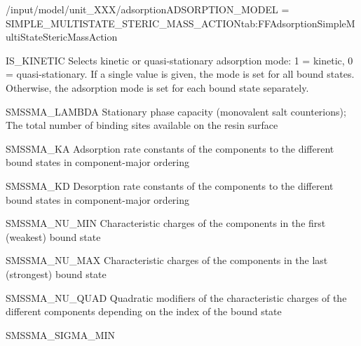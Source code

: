 \begin{condsubgroup}{/input/model/unit\_XXX/adsorption}{ADSORPTION\_MODEL = SIMPLE\_MULTISTATE\_STERIC\_MASS\_ACTION}{tab:FFAdsorptionSimpleMultiStateStericMassAction}
\begin{dataset}[type=int,range={$\{ 0,1 \}$},length={1 / \texttt{NTOTALBND}}]{IS\_KINETIC}
    Selects kinetic or quasi-stationary adsorption mode: 1 = kinetic, 0 = quasi-stationary.
    If a single value is given, the mode is set for all bound states.
    Otherwise, the adsorption mode is set for each bound state separately.
  \end{dataset}
  \begin{dataset}[unit=\si{\mol\per\cubic\metre\of{SP}}, type = double, range={$\geq 0$}, length={1}]{SMSSMA\_LAMBDA} 
    Stationary phase capacity (monovalent salt counterions); The total number of binding sites available on the resin surface
  \end{dataset}
  \begin{dataset}[unit=\si{\raiseto{3}\metre\of{MP}\per\raiseto{3}\metre\of{SP}\per\second} , type = double, range={$\geq 0$}, length={\texttt{NTOTALBND}}]{SMSSMA\_KA} 
    Adsorption rate constants of the components to the different bound states in component-major ordering
  \end{dataset} 
  \begin{dataset}[unit=\si{\per\second}, type = double, range={$\geq 0$}, length={\texttt{NTOTALBND}}]{SMSSMA\_KD} 
    Desorption rate constants of the components to the different bound states in component-major ordering
  \end{dataset} 
  \begin{dataset}[unit=\si{\per\second}, type = double, range={$\geq 0$}, length={\texttt{NCOMP}}]{SMSSMA\_NU\_MIN} 
    Characteristic charges of the components in the first (weakest) bound state
  \end{dataset} 
  \begin{dataset}[type = double, range={$\geq 0$}, length={\texttt{NCOMP}}]{SMSSMA\_NU\_MAX} 
    Characteristic charges of the components in the last (strongest) bound state
  \end{dataset} 
  \begin{dataset}[type = double, range={$\mathds{R}$}, length={\texttt{NCOMP}}]{SMSSMA\_NU\_QUAD} 
    Quadratic modifiers of the characteristic charges of the different components depending on the index of the bound state
  \end{dataset} 
  \begin{dataset}[type = double, range={$\geq 0$}, length={\texttt{NCOMP}}]{SMSSMA\_SIGMA\_MIN} 

\end{dataset}
\end{condsubgroup}
